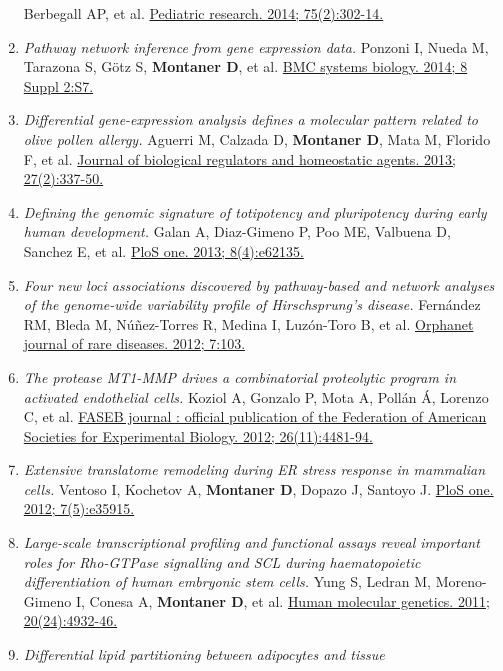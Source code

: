 \begin{enumerate}
  Berbegall AP, et al.
  \href{http://www.ncbi.nlm.nih.gov//pubmed/24216542}{Pediatric
  research. 2014; 75(2):302-14.}
\item
  \emph{Pathway network inference from gene expression data.} Ponzoni I,
  Nueda M, Tarazona S, Götz S, \textbf{Montaner D}, et al.
  \href{http://www.ncbi.nlm.nih.gov//pubmed/25032889}{BMC systems
  biology. 2014; 8 Suppl 2:S7.}
\item
  \emph{Differential gene-expression analysis defines a molecular
  pattern related to olive pollen allergy.} Aguerri M, Calzada D,
  \textbf{Montaner D}, Mata M, Florido F, et al.
  \href{http://www.ncbi.nlm.nih.gov//pubmed/23830385}{Journal of
  biological regulators and homeostatic agents. 2013; 27(2):337-50.}
\item
  \emph{Defining the genomic signature of totipotency and pluripotency
  during early human development.} Galan A, Diaz-Gimeno P, Poo ME,
  Valbuena D, Sanchez E, et al.
  \href{http://www.ncbi.nlm.nih.gov//pubmed/23614026}{PloS one. 2013;
  8(4):e62135.}
\item
  \emph{Four new loci associations discovered by pathway-based and
  network analyses of the genome-wide variability profile of
  Hirschsprung's disease.} Fernández RM, Bleda M, Núñez-Torres R, Medina
  I, Luzón-Toro B, et al.
  \href{http://www.ncbi.nlm.nih.gov//pubmed/23270508}{Orphanet journal
  of rare diseases. 2012; 7:103.}
\item
  \emph{The protease MT1-MMP drives a combinatorial proteolytic program
  in activated endothelial cells.} Koziol A, Gonzalo P, Mota A, Pollán
  Á, Lorenzo C, et al.
  \href{http://www.ncbi.nlm.nih.gov//pubmed/22859368}{FASEB journal :
  official publication of the Federation of American Societies for
  Experimental Biology. 2012; 26(11):4481-94.}
\item
  \emph{Extensive translatome remodeling during ER stress response in
  mammalian cells.} Ventoso I, Kochetov A, \textbf{Montaner D}, Dopazo
  J, Santoyo J. \href{http://www.ncbi.nlm.nih.gov//pubmed/22574127}{PloS
  one. 2012; 7(5):e35915.}
\item
  \emph{Large-scale transcriptional profiling and functional assays
  reveal important roles for Rho-GTPase signalling and SCL during
  haematopoietic differentiation of human embryonic stem cells.} Yung S,
  Ledran M, Moreno-Gimeno I, Conesa A, \textbf{Montaner D}, et al.
  \href{http://www.ncbi.nlm.nih.gov//pubmed/21937587}{Human molecular
  genetics. 2011; 20(24):4932-46.}
\item
  \emph{Differential lipid partitioning between adipocytes and tissue
}
\end{enumerate}
